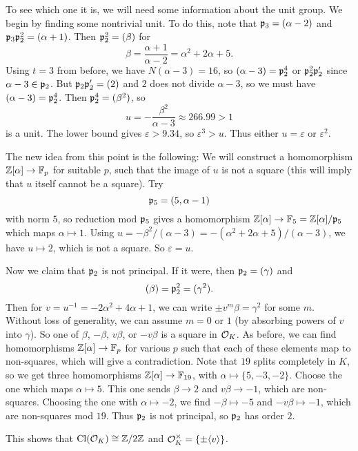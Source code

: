 \begin{example}
  To see which one it is, we will need some
  information about the unit group. We begin
  by finding some nontrivial unit.
  To do this, note that $\mathfrak{p}_3 = (\alpha - 2)$ and
  $\mathfrak{p}_3 \mathfrak{p}_2^2 = (\alpha + 1)$. Then $\mathfrak{p}_2^2 = (\beta)$
  for
  \[
    \beta = \frac{\alpha + 1}{\alpha - 2} = \alpha^2 + 2\alpha + 5.
  \]
  Using $t = 3$ from before, we have
  $N(\alpha - 3) = 16$, so $(\alpha - 3) = \mathfrak{p}_2^4$ or
  $\mathfrak{p}_2^2 \mathfrak{p}_2'$ since $\alpha - 3 \in \mathfrak{p}_2$.
  But $\mathfrak{p}_2 \mathfrak{p}_2' = (2)$ and $2$ does not divide
  $\alpha - 3$, so we must have $(\alpha - 3) = \mathfrak{p}_2^4$.
  Then $\mathfrak{p}_2^4 = (\beta^2)$, so
  \[
    u = -\frac{\beta^2}{\alpha - 3} \approx 266.99 > 1
  \]
  is a unit. The lower bound gives
  $\varepsilon > 9.34$, so $\varepsilon^3 > u$.
  Thus either $u = \varepsilon$ or $\varepsilon^2$.

  The new idea from this point is the following:
  We will construct a homomorphism
  $\mathbb{Z}[\alpha] \to \mathbb{F}_p$ for suitable $p$, such that
  the image of $u$ is not a square (this will imply
  that $u$ itself cannot be a square). Try
  \[
    \mathfrak{p}_5 = (5, \alpha - 1)
  \]
  with norm $5$, so reduction
  mod $\mathfrak{p}_5$ gives a homomorphism
  $\mathbb{Z}[\alpha] \to \mathbb{F}_5 = \mathbb{Z}[\alpha] / \mathfrak{p}_5$ which
  maps $\alpha \mapsto 1$. Using
  $u = -\beta^2 / (\alpha - 3) = -(\alpha^2 + 2\alpha + 5) / (\alpha - 3)$,
  we have $u \mapsto 2$, which is not a
  square.
  So $\varepsilon = u$.

  Now we claim that $\mathfrak{p}_2$ is not principal.
  If it were, then $\mathfrak{p}_2 = (\gamma)$ and
  \[
    (\beta) = \mathfrak{p}_2^2 = (\gamma^2).
  \]
  Then for $v = u^{-1} = -2\alpha^2 + 4\alpha + 1$,
  we can write $\pm v^m \beta = \gamma^2$ for some
  $m$. Without loss of generality, we can assume
  $m = 0$ or $1$ (by absorbing powers of $v$ into
  $\gamma$). So one of $\beta$, $-\beta$, $v\beta$, or
  $-v\beta$ is a square in $\mathcal{O}_K$.
  As before, we can find homomorphisms $\mathbb{Z}[\alpha] \to \mathbb{F}_p$ for various
  $p$ such that each of these elements map to
  non-squares, which
  will give a contradiction. Note that $19$ splits
  completely in $K$, so we get three homomorphisms
  $\mathbb{Z}[\alpha] \to \mathbb{F}_{19}$, with $\alpha \mapsto \{5, -3, -2\}$.
  Choose the one which maps $\alpha \mapsto 5$.
  This one sends $\beta \to 2$ and $v\beta \to -1$,
  which are non-squares. Choosing the one
  with $\alpha \mapsto -2$, we find
  $-\beta \mapsto -5$ and $-v\beta \mapsto -1$,
  which are non-squares mod $19$. Thus
  $\mathfrak{p}_2$ is not principal, so $\mathfrak{p}_2$ has order $2$.

  This shows that $\operatorname{Cl}(\mathcal{O}_K) \cong \mathbb{Z} / 2\mathbb{Z}$
  and $\mathcal{O}_K^\times = \{\pm \langle v \rangle\}$.
\end{example}
